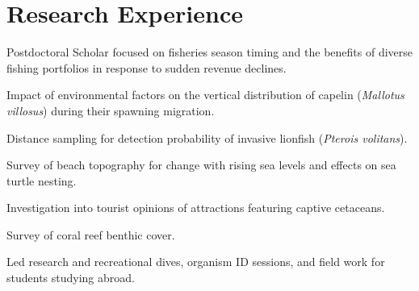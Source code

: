 \documentclass[a4paper]{deedy-resume} %
\begin{document}

\section{Research Experience}


Postdoctoral Scholar focused on fisheries season timing and the benefits of diverse fishing portfolios in response to sudden revenue declines.

\sectionspace %



Impact of environmental factors on the vertical distribution of capelin (\textit{Mallotus villosus}) during their spawning migration.

\sectionspace %



\begin{tightitemize}
\item Distance sampling for detection probability of invasive lionfish (\textit{Pterois volitans}).
\item Survey of beach topography for change with rising sea levels and effects on sea turtle nesting.
\item Investigation into tourist opinions of attractions featuring captive cetaceans.
\item Survey of coral reef benthic cover.
\item Led research and recreational dives, organism ID sessions, and field work for students studying abroad.
\end{tightitemize}
\end{document}
